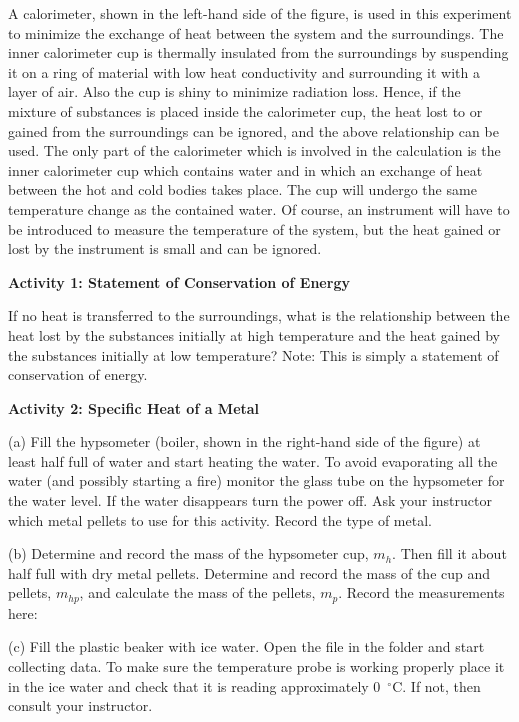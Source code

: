 A calorimeter, shown in the left-hand side of the figure, is used in this experiment
to minimize the exchange of heat between the system and the surroundings.
The inner calorimeter cup is thermally insulated from the surroundings
by suspending it on a ring of material with low heat conductivity
and surrounding it with a layer of air. Also the cup is shiny to minimize
radiation loss. Hence, if the mixture of substances is placed inside
the calorimeter cup, the heat lost to or gained from the surroundings
can be ignored, and the above relationship can be used. The only part
of the calorimeter which is involved in the calculation is the inner
calorimeter cup which contains water and in which an exchange of heat
between the hot and cold bodies takes place. The cup will undergo
the same temperature change as the contained water. Of course, an
instrument will have to be introduced to measure the temperature of
the system, but the heat gained or lost by the instrument is small
and can be ignored.

\pagebreak[3]

\textbf{Activity 1: Statement of Conservation of Energy}

If no heat is transferred to the surroundings, what is the relationship
between the heat lost by the substances initially at high temperature
and the heat gained by the substances initially at low temperature?
Note: This is simply a statement of conservation of energy.
\answerspace{15mm}

\textbf{Activity 2: Specific Heat of a Metal}

(a) Fill the hypsometer (boiler, shown in the right-hand side of the figure) 
at least half full of water and start heating the water. 
To avoid evaporating all the water (and possibly starting a fire) monitor 
the glass tube on the hypsometer for the water level.
If the water disappears turn the power off.
Ask your instructor which metal pellets to use for this activity.
Record the type of metal.
\answerspace{10mm}

(b) Determine and record the mass of the hypsometer cup, $m_h$.
Then fill it about half full with dry metal pellets. Determine
and record the mass of the cup and pellets, $m_{hp}$, and calculate
the mass of the pellets, $m_p$. Record the measurements here:
\answerspace{10mm}

(c) Fill the plastic beaker with ice water. Open the file 
in the \filename{\coursefolder} folder and start
collecting data. To make sure the temperature probe is working 
properly place it in the ice water and
check that it is reading approximately 0~$^{\circ }$C. If not,
then consult your instructor.

